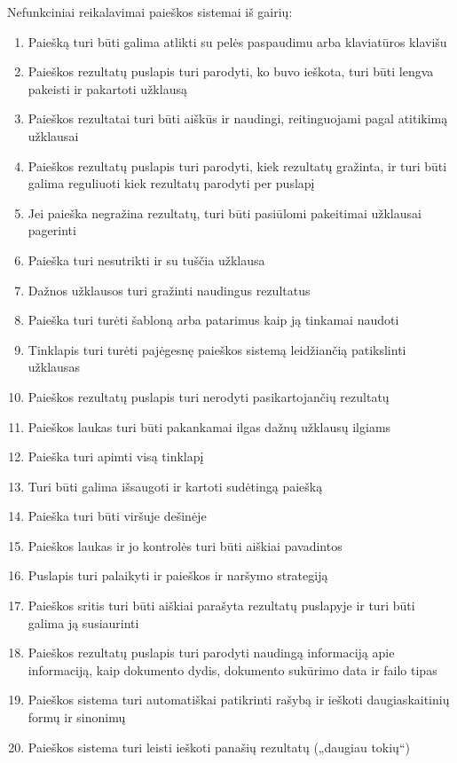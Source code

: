 \documentclass{VUMIFPSkursinis}
\begin{document}
Nefunkciniai reikalavimai paieškos sistemai iš gairių:
\begin{enumerate}
	\item Paiešką turi būti galima atlikti su pelės paspaudimu arba klaviatūros klavišu
	\item Paieškos rezultatų puslapis turi parodyti, ko buvo ieškota, turi būti lengva pakeisti ir pakartoti užklausą
	\item Paieškos rezultatai turi būti aiškūs ir naudingi, reitinguojami pagal atitikimą užklausai
	\item Paieškos rezultatų puslapis turi parodyti, kiek rezultatų gražinta, ir turi būti galima reguliuoti kiek rezultatų parodyti per puslapį
	\item Jei paieška negražina rezultatų, turi būti pasiūlomi pakeitimai užklausai pagerinti
	\item Paieška turi nesutrikti ir su tuščia užklausa
	\item Dažnos užklausos turi gražinti naudingus rezultatus
	\item Paieška turi turėti šabloną arba patarimus kaip ją tinkamai naudoti
	\item Tinklapis turi turėti pajėgesnę paieškos sistemą leidžiančią patikslinti užklausas
	\item Paieškos rezultatų puslapis turi nerodyti pasikartojančių rezultatų
	\item Paieškos laukas turi būti pakankamai ilgas dažnų užklausų ilgiams
	\item Paieška turi apimti visą tinklapį
	\item Turi būti galima išsaugoti ir kartoti sudėtingą paiešką
	\item Paieška turi būti viršuje dešinėje
	\item Paieškos laukas ir jo kontrolės turi būti aiškiai pavadintos
	\item Puslapis turi palaikyti ir paieškos ir naršymo strategiją
	\item Paieškos sritis turi būti aiškiai parašyta rezultatų puslapyje ir turi būti galima ją susiaurinti
	\item Paieškos rezultatų puslapis turi parodyti naudingą informaciją apie informaciją, kaip dokumento dydis, dokumento sukūrimo data ir failo tipas
	\item Paieškos sistema turi automatiškai patikrinti rašybą ir ieškoti daugiaskaitinių formų ir sinonimų
	\item Paieškos sistema turi leisti ieškoti panašių rezultatų („daugiau tokių“)
\end{enumerate}
\end{document}
